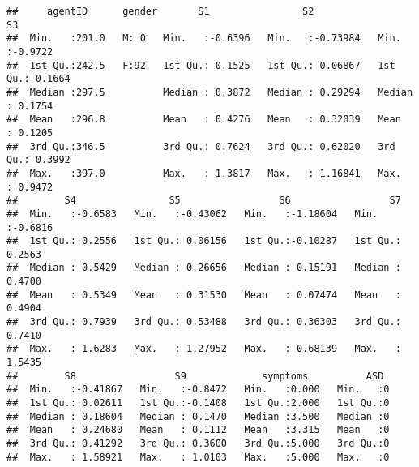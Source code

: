 \documentclass[]{article}
\begin{document}
\begin{verbatim}
##     agentID      gender       S1                S2                 S3         
##  Min.   :201.0   M: 0   Min.   :-0.6396   Min.   :-0.73984   Min.   :-0.9722  
##  1st Qu.:242.5   F:92   1st Qu.: 0.1525   1st Qu.: 0.06867   1st Qu.:-0.1664  
##  Median :297.5          Median : 0.3872   Median : 0.29294   Median : 0.1754  
##  Mean   :296.8          Mean   : 0.4276   Mean   : 0.32039   Mean   : 0.1205  
##  3rd Qu.:346.5          3rd Qu.: 0.7624   3rd Qu.: 0.62020   3rd Qu.: 0.3992  
##  Max.   :397.0          Max.   : 1.3817   Max.   : 1.16841   Max.   : 0.9472  
##        S4                S5                 S6                 S7         
##  Min.   :-0.6583   Min.   :-0.43062   Min.   :-1.18604   Min.   :-0.6816  
##  1st Qu.: 0.2556   1st Qu.: 0.06156   1st Qu.:-0.10287   1st Qu.: 0.2563  
##  Median : 0.5429   Median : 0.26656   Median : 0.15191   Median : 0.4700  
##  Mean   : 0.5349   Mean   : 0.31530   Mean   : 0.07474   Mean   : 0.4904  
##  3rd Qu.: 0.7939   3rd Qu.: 0.53488   3rd Qu.: 0.36303   3rd Qu.: 0.7410  
##  Max.   : 1.6283   Max.   : 1.27952   Max.   : 0.68139   Max.   : 1.5435  
##        S8                 S9             symptoms          ASD   
##  Min.   :-0.41867   Min.   :-0.8472   Min.   :0.000   Min.   :0  
##  1st Qu.: 0.02611   1st Qu.:-0.1408   1st Qu.:2.000   1st Qu.:0  
##  Median : 0.18604   Median : 0.1470   Median :3.500   Median :0  
##  Mean   : 0.24680   Mean   : 0.1112   Mean   :3.315   Mean   :0  
##  3rd Qu.: 0.41292   3rd Qu.: 0.3600   3rd Qu.:5.000   3rd Qu.:0  
##  Max.   : 1.58921   Max.   : 1.0103   Max.   :5.000   Max.   :0
\end{verbatim}
\end{document}
